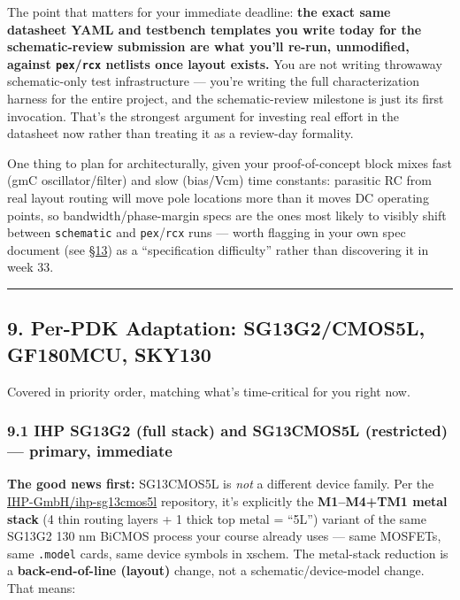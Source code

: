 \documentclass[
]{article}
\begin{document}
The point that matters for your immediate deadline: \textbf{the exact
same datasheet YAML and testbench templates you write today for the
schematic-review submission are what you'll re-run, unmodified, against
\texttt{pex}/\texttt{rcx} netlists once layout exists.} You are not
writing throwaway schematic-only test infrastructure --- you're writing
the full characterization harness for the entire project, and the
schematic-review milestone is just its first invocation. That's the
strongest argument for investing real effort in the datasheet now rather
than treating it as a review-day formality.

One thing to plan for architecturally, given your proof-of-concept block
mixes fast (gmC oscillator/filter) and slow (bias/Vcm) time constants:
parasitic RC from real layout routing will move pole locations more than
it moves DC operating points, so bandwidth/phase-margin specs are the
ones most likely to visibly shift between \texttt{schematic} and
\texttt{pex}/\texttt{rcx} runs --- worth flagging in your own spec
document (see
\protect\hyperlink{13-the-chipalooza-2-analog-harness-and-what-it-means-for-your-cace-setup}{§13})
as a ``specification difficulty'' rather than discovering it in week 33.

\begin{center}\rule{0.5\linewidth}{0.5pt}\end{center}

\hypertarget{per-pdk-adaptation-sg13g2cmos5l-gf180mcu-sky130}{%
\subsection{9. Per-PDK Adaptation: SG13G2/CMOS5L, GF180MCU,
SKY130}\label{per-pdk-adaptation-sg13g2cmos5l-gf180mcu-sky130}}

Covered in priority order, matching what's time-critical for you right
now.

\hypertarget{ihp-sg13g2-full-stack-and-sg13cmos5l-restricted-primary-immediate}{%
\subsubsection{9.1 IHP SG13G2 (full stack) and SG13CMOS5L (restricted)
--- primary,
immediate}\label{ihp-sg13g2-full-stack-and-sg13cmos5l-restricted-primary-immediate}}

\textbf{The good news first:} SG13CMOS5L is \emph{not} a different
device family. Per the
\href{https://github.com/IHP-GmbH/ihp-sg13cmos5l}{IHP-GmbH/ihp-sg13cmos5l}
repository, it's explicitly the \textbf{M1--M4+TM1 metal stack} (4 thin
routing layers + 1 thick top metal = ``5L'') variant of the same SG13G2
130 nm BiCMOS process your course already uses --- same MOSFETs, same
\texttt{.model} cards, same device symbols in xschem. The metal-stack
reduction is a \textbf{back-end-of-line (layout)} change, not a
schematic/device-model change. That means:
\end{document}
